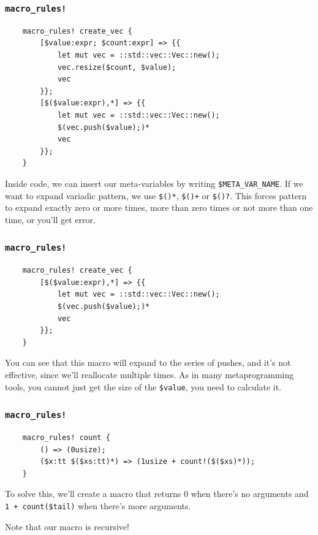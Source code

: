 \documentclass[aspectratio=1610,t]{beamer}
\begin{document}

\begin{frame}[fragile]
\frametitle{\texttt{macro\_rules!}}
\begin{verbatim}
    macro_rules! create_vec {
        [$value:expr; $count:expr] => {{
            let mut vec = ::std::vec::Vec::new();
            vec.resize($count, $value);
            vec
        }};
        [$($value:expr),*] => {{
            let mut vec = ::std::vec::Vec::new();
            $(vec.push($value);)*
            vec
        }};
    }
\end{verbatim}

Inside code, we can insert our meta-variables by writing \texttt{\$META\_VAR\_NAME}. If we want to expand variadic pattern, we use \texttt{\$()*}, \texttt{\$()+} or \texttt{\$()?}. This forces pattern to expand exactly zero or more times, more than zero times or not more than one time, or you'll get error.
\end{frame}


\begin{frame}[fragile]
\frametitle{\texttt{macro\_rules!}}
\begin{verbatim}
    macro_rules! create_vec {
        [$($value:expr),*] => {{
            let mut vec = ::std::vec::Vec::new();
            $(vec.push($value);)*
            vec
        }};
    }
\end{verbatim}

You can see that this macro will expand to the series of pushes, and it's not effective, since we'll reallocate multiple times. As in many metaprogramming tools, you cannot just get the size of the \texttt{\$value}, you need to calculate it.
\end{frame}


\begin{frame}[fragile]
\frametitle{\texttt{macro\_rules!}}
\begin{verbatim}
    macro_rules! count {
        () => (0usize);
        ($x:tt $($xs:tt)*) => (1usize + count!($($xs)*));
    }
\end{verbatim}

To solve this, we'll create a macro that returns 0 when there's no arguments and \texttt{1 + count(\$tail)} when there's more arguments.

Note that our macro is recursive!
\end{frame}
\end{document}
